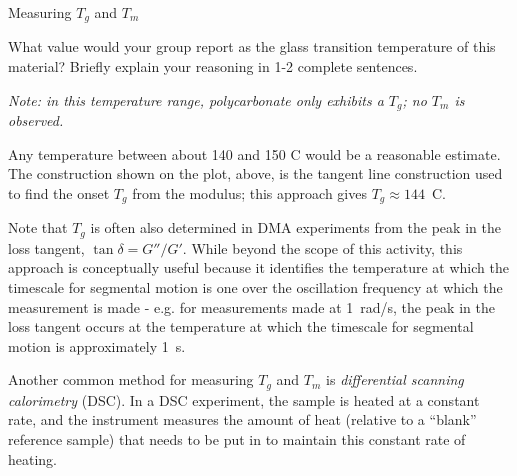 \begin{activity}{Measuring $T_g$ and $T_m$}
\begin{ctqs}
		What value would your group report as the glass transition temperature of this material?  Briefly explain your reasoning in 1-2 complete sentences.
		
		\emph{Note: in this temperature range, polycarbonate only exhibits a $T_g$; no $T_m$ is observed.}
		
		\begin{solution}[1in]
			Any temperature between about 140 and 150 C would be a reasonable estimate.  The construction shown on the plot, above, is the tangent line construction used to find the onset $T_g$ from the modulus; this approach gives $T_g \approx 144$~C.
			
			Note that $T_g$ is often also determined in DMA experiments from the peak in the loss tangent, $\tan\delta = G''/G'$. While beyond the scope of this activity, this approach is conceptually useful because it identifies the temperature at which the timescale for segmental motion is one over the oscillation frequency at which the measurement is made - e.g. for measurements made at 1~rad/s, the peak in the loss tangent occurs at the temperature at which the timescale for segmental motion is approximately 1~s.
		\end{solution}
	
\end{ctqs}

	
	



\begin{model}
	
	Another common method for measuring $T_g$ and $T_m$ is \emph{differential scanning calorimetry} (DSC).  In a DSC experiment, the sample is heated at a constant rate, and the instrument measures the amount of heat (relative to a ``blank'' reference sample) that needs to be put in to maintain this constant rate of heating.
	

\end{model}
\end{activity}
